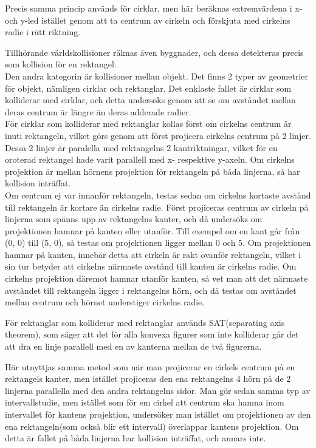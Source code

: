 \documentclass[12pt,a4paper]{article}
\begin{document}
Precis samma princip används för cirklar, men här beräknas extremvärdena i x- och y-led istället genom att ta centrum av cirkeln och förskjuta med cirkelns radie i rätt riktning.

Tillhörande världskollisioner räknas även byggnader, och dessa detekteras precis som kollision för en rektangel. \\

Den andra kategorin är kollisioner mellan objekt. Det finns 2 typer av geometrier för objekt, nämligen cirklar och rektanglar. Det enklaste fallet är cirklar som kolliderar med cirklar, och detta undersöks genom att se om avståndet mellan deras centrum är längre än deras adderade radier. \\

För cirklar som kolliderar med rektanglar kollas först om cirkelns centrum är inuti rektangeln, vilket görs genom att först projicera cirkelns centrum på 2 linjer. Dessa 2 linjer är paralella med rektangelns 2 kantriktningar, vilket för en oroterad rektangel hade varit parallell med x- respektive y-axeln. Om cirkelns projektion är mellan hörnens projektion för rektangeln på båda linjerna, så har kollision inträffat. \\

Om centrum ej var innanför rektangeln, testas sedan om cirkelns kortaste avstånd till rektangeln är kortare än cirkelns radie. Först projiceras centrum av cirkeln på linjerna som spänns upp av rektangelns kanter, och då undersöks om projektionen hamnar på kanten eller utanför. Till exempel om en kant går från (0, 0) till (5, 0), så testas om projektionen ligger mellan 0 och 5. Om projektionen hamnar på kanten, innebär detta att cirkeln är rakt ovanför rektangeln, vilket i sin tur betyder att cirkelns närmaste avstånd till kanten är cirkelns radie. Om cirkelns projektion däremot hamnar utanför kanten, så vet man att det närmaste avståndet till rektangeln ligger i rektangelns hörn, och då testas om avståndet mellan centrum och hörnet understiger cirkelns radie.

\vspace{0.2cm}

För rektanglar som kolliderar med rektanglar används SAT(separating axis theorem), som säger att det för alla konvexa figurer som inte kolliderar går det att dra en linje parallell med en av kanterna mellan de två figurerna.

Här utnyttjas samma metod som när man projicerar en cirkels centrum på en rektangels kanter, men istället projiceras den ena rektangelns 4 hörn på de 2 linjerna parallella med den andra rektangelns sidor. Man gör sedan samma typ av intervallstudie, men istället som för em cirkel att centrum ska hamna inom intervallet för kantens projektion, undersöker man istället om projektionen av den ena rektangeln(som också blir ett intervall) överlappar kantens projektion. Om detta är fallet på båda linjerna har kollision inträffat, och annars inte.
\end{document}
